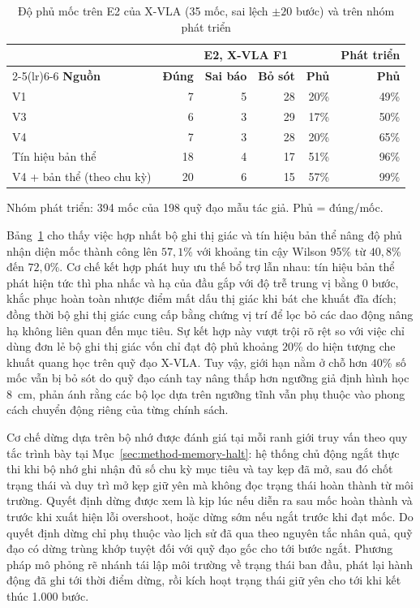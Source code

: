 \begin{table}[htbp]
\centering\small
\caption{Độ phủ mốc trên E2 của X-VLA (35 mốc, sai lệch $\pm 20$ bước) và trên nhóm phát triển}
\label{tab:xvla-writer-recall}
\setlength{\tabcolsep}{4pt}
\begin{tabular}{l|r|r|r|r|r}
\toprule
& \multicolumn{4}{c}{\textbf{E2, X-VLA F1}} & \textbf{Phát triển} \\
\cmidrule(lr){2-5}\cmidrule(lr){6-6}
\textbf{Nguồn} & \textbf{Đúng} & \textbf{Sai báo} & \textbf{Bỏ sót} & \textbf{Phủ} & \textbf{Phủ} \\
\midrule
V1 & 7 & 5 & 28 & 20\% & 49\% \\
V3 & 6 & 3 & 29 & 17\% & 50\% \\
V4 & 7 & 3 & 28 & 20\% & 65\% \\
Tín hiệu bản thể & 18 & 4 & 17 & 51\% & 96\% \\
V4 + bản thể (theo chu kỳ) & 20 & 6 & 15 & 57\% & 99\% \\
\bottomrule
\end{tabular}
\par\smallskip
{\footnotesize Nhóm phát triển: 394 mốc của 198 quỹ đạo mẫu tác giả. Phủ = đúng/mốc.\par}
\end{table}

Bảng~\ref{tab:xvla-writer-recall} cho thấy việc hợp nhất bộ ghi thị giác và tín hiệu bản thể nâng độ phủ nhận diện mốc thành công lên $57{,}1$\% với khoảng tin cậy Wilson 95\% từ $40{,}8$\% đến $72{,}0$\%. Cơ chế kết hợp phát huy ưu thế bổ trợ lẫn nhau: tín hiệu bản thể phát hiện tức thì pha nhấc và hạ của đầu gắp với độ trễ trung vị bằng 0 bước, khắc phục hoàn toàn nhược điểm mất dấu thị giác khi bát che khuất đĩa đích; đồng thời bộ ghi thị giác cung cấp bằng chứng vị trí để lọc bỏ các dao động nâng hạ không liên quan đến mục tiêu. Sự kết hợp này vượt trội rõ rệt so với việc chỉ dùng đơn lẻ bộ ghi thị giác vốn chỉ đạt độ phủ khoảng $20$\% do hiện tượng che khuất quang học trên quỹ đạo X-VLA. Tuy vậy, giới hạn nằm ở chỗ hơn $40$\% số mốc vẫn bị bỏ sót do quỹ đạo cánh tay nâng thấp hơn ngưỡng giả định hình học 8~cm, phản ánh rằng các bộ lọc dựa trên ngưỡng tĩnh vẫn phụ thuộc vào phong cách chuyển động riêng của từng chính sách.

\label{sec:halt-timing}
\label{sec:halt-forks}
Cơ chế dừng dựa trên bộ nhớ được đánh giá tại mỗi ranh giới truy vấn theo quy tắc trình bày tại Mục~\ref{sec:method-memory-halt}: hệ thống chủ động ngắt thực thi khi bộ nhớ ghi nhận đủ số chu kỳ mục tiêu và tay kẹp đã mở, sau đó chốt trạng thái và duy trì mở kẹp giữ yên mà không đọc trạng thái hoàn thành từ môi trường. Quyết định dừng được xem là kịp lúc nếu diễn ra sau mốc hoàn thành và trước khi xuất hiện lỗi overshoot, hoặc dừng sớm nếu ngắt trước khi đạt mốc. Do quyết định dừng chỉ phụ thuộc vào lịch sử đã qua theo nguyên tắc nhân quả, quỹ đạo có dừng trùng khớp tuyệt đối với quỹ đạo gốc cho tới bước ngắt. Phương pháp mô phỏng rẽ nhánh tái lập môi trường về trạng thái ban đầu, phát lại hành động đã ghi tới thời điểm dừng, rồi kích hoạt trạng thái giữ yên cho tới khi kết thúc 1.000 bước.


